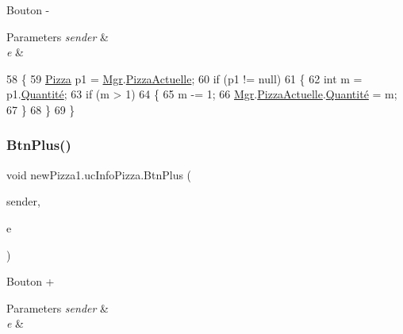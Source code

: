Bouton -\/ 


\begin{DoxyParams}{Parameters}
{\em sender} & \\
\hline
{\em e} & \\
\hline
\end{DoxyParams}

\begin{DoxyCode}
58         \{
59             \hyperlink{classModele_1_1Pizza}{Pizza} p1 = \hyperlink{classnewPizza1_1_1ucInfoPizza_ade399f2ed146dd3b5b0a4784a8670652}{Mgr}.\hyperlink{classModele_1_1Manager_a7e69844aeeebbc80144850efc0d2b94c}{PizzaActuelle};
60             \textcolor{keywordflow}{if} (p1 != null)
61             \{
62                 \textcolor{keywordtype}{int} m = p1.\hyperlink{classModele_1_1Pizza_ae755ca79feb6f9a522aa18544c3f1310}{Quantité};
63                 \textcolor{keywordflow}{if} (m > 1)
64                 \{
65                     m -= 1;
66                     \hyperlink{classnewPizza1_1_1ucInfoPizza_ade399f2ed146dd3b5b0a4784a8670652}{Mgr}.\hyperlink{classModele_1_1Manager_a7e69844aeeebbc80144850efc0d2b94c}{PizzaActuelle}.\hyperlink{classModele_1_1Pizza_ae755ca79feb6f9a522aa18544c3f1310}{Quantité} = m;
67                 \}
68             \}
69         \}
\end{DoxyCode}
\mbox{\label{classnewPizza1_1_1ucInfoPizza_a7edd9606b816156d4b04e9f3126bda3a}} 
\subsubsection{\texorpdfstring{Btn\+Plus()}{BtnPlus()}}
{\footnotesize\ttfamily void new\+Pizza1.\+uc\+Info\+Pizza.\+Btn\+Plus (\begin{DoxyParamCaption}\item[{object}]{sender,  }\item[{Routed\+Event\+Args}]{e }\end{DoxyParamCaption})\hspace{0.3cm}{\ttfamily [inline]}}



Bouton + 


\begin{DoxyParams}{Parameters}
{\em sender} & \\
\hline
{\em e} & \\
\hline
\end{DoxyParams}

